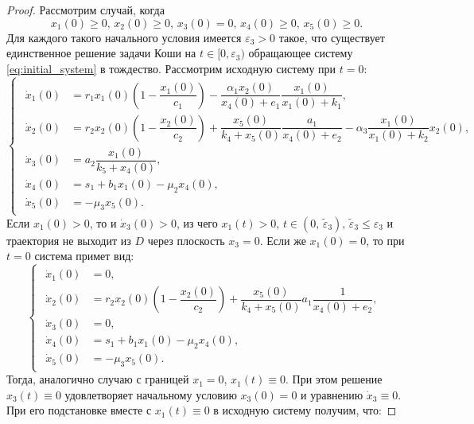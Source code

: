 \documentclass[14pt,a4paper]{extarticle}
\begin{document}
\begin{proof}
		Рассмотрим случай, когда
		\begin{equation}\label{eq:conds_3}
			x_1(0)\ge0,\, x_2(0)\ge0,\, x_3(0)=0,\, x_4(0)\ge0,\, x_5(0)\ge0.
		\end{equation}
		Для каждого такого начального условия имеется $\varepsilon_3>0$ такое, что существует единственное решение задачи Коши на $t\in[0,\varepsilon_3)$ обращающее систему \ref{eq:initial_system} в тождество. Рассмотрим исходную систему при $t=0$:
		\begin{equation*}
			\begin{cases}
				\begin{aligned}
					\dot{x}_1(0) &= r_1x_1(0)\left(1-\dfrac{x_1(0)}{c_1}\right)-\dfrac{\alpha_1x_2(0)}{x_4(0)+e_1}\dfrac{x_1(0)}{x_1(0)+k_1},\\
					\dot{x}_2(0) &= r_2x_2(0)\left(1-\dfrac{x_2(0)}{c_2}\right)+\dfrac{x_5(0)}{k_4+x_5(0)}\dfrac{a_1}{x_4(0)+e_2}-\alpha_3\dfrac{x_1(0)}{x_1(0)+k_2}x_2(0),\\
					\dot{x}_3(0) &= a_2\dfrac{x_1(0)}{k_5+x_4(0)},\\
					\dot{x}_4(0) &= s_1 + b_1x_1(0)-\mu_2x_4(0),\\
					\dot{x}_5(0) &= -\mu_3x_5(0).
				\end{aligned}
			\end{cases}
		\end{equation*}
		Если $x_1(0)>0$, то и $\dot{x}_3(0)>0$, из чего $x_1(t)>0,\, t\in(0,\, \tilde{\varepsilon}_3),\,\tilde{\varepsilon}_3\le\varepsilon_3$ и траектория не выходит из $D$ через плоскость $x_3=0$. Если же $x_1(0)=0$, то при $t=0$ система примет вид:
		\begin{equation*}
			\begin{cases}
				\begin{aligned}
					\dot{x}_1(0) &= 0,\\
					\dot{x}_2(0) &= r_2x_2(0)\left(1-\dfrac{x_2(0)}{c_2}\right)+\dfrac{x_5(0)}{k_4+x_5(0)}a_1\dfrac{1}{x_4(0)+e_2},\\
					\dot{x}_3(0) &= 0,\\
					\dot{x}_4(0) &= s_1 + b_1x_1(0)-\mu_2x_4(0),\\
					\dot{x}_5(0) &= -\mu_3x_5(0).
				\end{aligned}
			\end{cases}
		\end{equation*}
		Тогда, аналогично случаю с границей $x_1=0$, $x_1(t)\equiv0$. При этом решение $x_3(t)\equiv0$ удовлетворяет начальному условию $x_3(0)=0$ и уравнению $\dot{x}_3\equiv0$. При его подстановке вместе с $x_1(t)\equiv0$ в исходную систему получим, что:

\end{proof}
\end{document}
